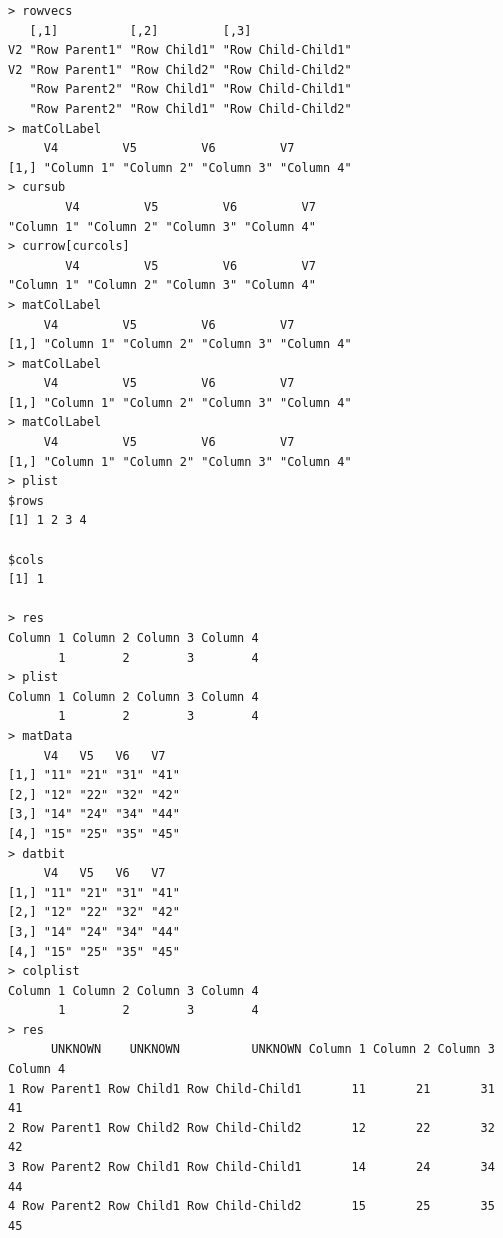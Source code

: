 \documentclass[a4paper]{article}
\begin{document}
\begin{verbatim}
> rowvecs 
   [,1]          [,2]         [,3]              
V2 "Row Parent1" "Row Child1" "Row Child-Child1"
V2 "Row Parent1" "Row Child2" "Row Child-Child2"
   "Row Parent2" "Row Child1" "Row Child-Child1"
   "Row Parent2" "Row Child1" "Row Child-Child2"
> matColLabel 
     V4         V5         V6         V7        
[1,] "Column 1" "Column 2" "Column 3" "Column 4"
> cursub 
        V4         V5         V6         V7 
"Column 1" "Column 2" "Column 3" "Column 4" 
> currow[curcols] 
        V4         V5         V6         V7 
"Column 1" "Column 2" "Column 3" "Column 4" 
> matColLabel 
     V4         V5         V6         V7        
[1,] "Column 1" "Column 2" "Column 3" "Column 4"
> matColLabel 
     V4         V5         V6         V7        
[1,] "Column 1" "Column 2" "Column 3" "Column 4"
> matColLabel 
     V4         V5         V6         V7        
[1,] "Column 1" "Column 2" "Column 3" "Column 4"
> plist 
$rows
[1] 1 2 3 4

$cols
[1] 1

> res 
Column 1 Column 2 Column 3 Column 4 
       1        2        3        4 
> plist 
Column 1 Column 2 Column 3 Column 4 
       1        2        3        4 
> matData 
     V4   V5   V6   V7  
[1,] "11" "21" "31" "41"
[2,] "12" "22" "32" "42"
[3,] "14" "24" "34" "44"
[4,] "15" "25" "35" "45"
> datbit 
     V4   V5   V6   V7  
[1,] "11" "21" "31" "41"
[2,] "12" "22" "32" "42"
[3,] "14" "24" "34" "44"
[4,] "15" "25" "35" "45"
> colplist 
Column 1 Column 2 Column 3 Column 4 
       1        2        3        4 
> res 
      UNKNOWN    UNKNOWN          UNKNOWN Column 1 Column 2 Column 3 Column 4
1 Row Parent1 Row Child1 Row Child-Child1       11       21       31       41
2 Row Parent1 Row Child2 Row Child-Child2       12       22       32       42
3 Row Parent2 Row Child1 Row Child-Child1       14       24       34       44
4 Row Parent2 Row Child1 Row Child-Child2       15       25       35       45
\end{verbatim}

\newpage
\end{document}
